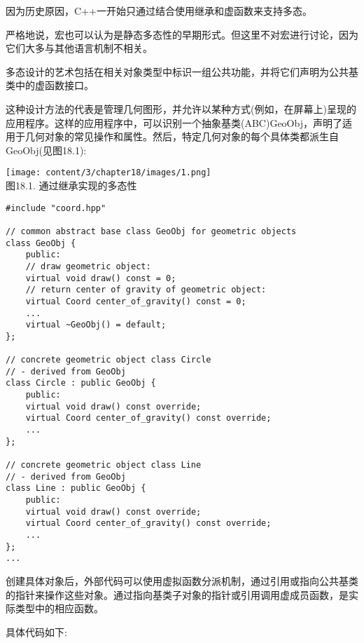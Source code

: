 
因为历史原因，C++一开始只通过结合使用继承和虚函数来支持多态。

\begin{tcolorbox}[colback=webgreen!5!white,colframe=webgreen!75!black]
\hspace*{0.75cm}严格地说，宏也可以认为是静态多态性的早期形式。但这里不对宏进行讨论，因为它们大多与其他语言机制不相关。
\end{tcolorbox}

多态设计的艺术包括在相关对象类型中标识一组公共功能，并将它们声明为公共基类中的虚函数接口。

这种设计方法的代表是管理几何图形，并允许以某种方式(例如，在屏幕上)呈现的应用程序。这样的应用程序中，可以识别一个抽象基类(ABC)GeoObj，声明了适用于几何对象的常见操作和属性。然后，特定几何对象的每个具体类都派生自GeoObj(见图18.1):

\begin{center}
\texttt{[image: content/3/chapter18/images/1.png]} \\
图18.1. 通过继承实现的多态性
\end{center}

\begin{lstlisting}[style=styleCXX]
#include "coord.hpp"

// common abstract base class GeoObj for geometric objects
class GeoObj {
	public:
	// draw geometric object:
	virtual void draw() const = 0;
	// return center of gravity of geometric object:
	virtual Coord center_of_gravity() const = 0;
	...
	virtual ~GeoObj() = default;
};

// concrete geometric object class Circle
// - derived from GeoObj
class Circle : public GeoObj {
	public:
	virtual void draw() const override;
	virtual Coord center_of_gravity() const override;
	...
};

// concrete geometric object class Line
// - derived from GeoObj
class Line : public GeoObj {
	public:
	virtual void draw() const override;
	virtual Coord center_of_gravity() const override;
	...
};
...
\end{lstlisting}

创建具体对象后，外部代码可以使用虚拟函数分派机制，通过引用或指向公共基类的指针来操作这些对象。通过指向基类子对象的指针或引用调用虚成员函数，是实际类型中的相应函数。

具体代码如下:

